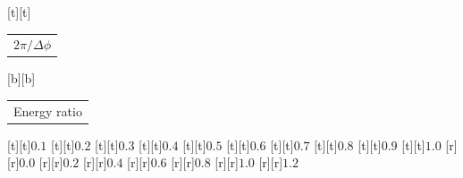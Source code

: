 %    
%
%
\begin{psfrags}%
\psfragscanon%
%
[t][t]{\color[rgb]{0,0,0}\setlength{\tabcolsep}{0pt}\begin{tabular}{c}{\Large$2\pi/\Delta\phi$}\end{tabular}}%
[b][b]{\color[rgb]{0,0,0}\setlength{\tabcolsep}{0pt}\begin{tabular}{c}{\Large{}Energy ratio}\end{tabular}}%
%
[t][t]{$0.1$}%
[t][t]{$0.2$}%
[t][t]{$0.3$}%
[t][t]{$0.4$}%
[t][t]{$0.5$}%
[t][t]{$0.6$}%
[t][t]{$0.7$}%
[t][t]{$0.8$}%
[t][t]{$0.9$}%
[t][t]{$1.0$}%
%
[r][r]{$0.0$}%
[r][r]{$0.2$}%
[r][r]{$0.4$}%
[r][r]{$0.6$}%
[r][r]{$0.8$}%
[r][r]{$1.0$}%
[r][r]{$1.2$}%
%
%
\end{psfrags}%
%
